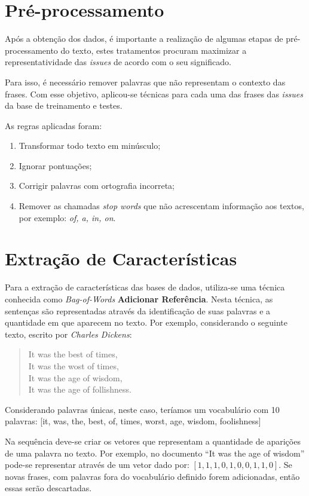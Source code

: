 \documentclass[conference]{IEEEtran}
\begin{document}
\section{Pré-processamento}

Após a obtenção dos dados, é importante a realização de algumas etapas de pré-processamento do texto, estes tratamentos procuram maximizar a representatividade das \textit{issues} de acordo com o seu significado.

Para isso, é necessário remover palavras que não representam o contexto das frases. Com esse objetivo, aplicou-se técnicas para cada uma das frases das \textit{issues} da base de treinamento e testes.

As regras aplicadas foram:

\begin{enumerate}
    \item Transformar todo texto em minúsculo;
    \item Ignorar pontuações;
    \item Corrigir palavras com ortografia incorreta;
    \item Remover as chamadas \textit{stop words} que não acrescentam informação aos textos, por exemplo: \textit{of, a, in, on}.
\end{enumerate}

\section{Extração de Características}

Para a extração de características das bases de dados, utiliza-se uma técnica conhecida como \textit{Bag-of-Words} \textbf{Adicionar Referência}. Nesta técnica, as sentenças são representadas através da identificação de suas palavras e a quantidade em que aparecem no texto. Por exemplo, considerando o seguinte texto, escrito por \textit{Charles Dickens}:

\begin{quote}
    It was the best of times,\\
    It was the wost of times,\\
    It was the age of wisdom,\\
    It was the age of follishness.
\end{quote}

Considerando palavras únicas, neste caso, teríamos um vocabulário com 10 palavras: [it, was, the, best, of, times, worst, age, wisdom, foolishness]

Na sequência deve-se criar os vetores que representam a quantidade de aparições de uma palavra no texto. Por exemplo, no documento ``It was the age of wisdom'' pode-se representar através de um vetor dado por: $[1, 1, 1, 0, 1, 0, 0, 1, 1, 0]$. Se novas frases, com palavras fora do vocabulário definido forem adicionadas, então essas serão descartadas.
\end{document}
